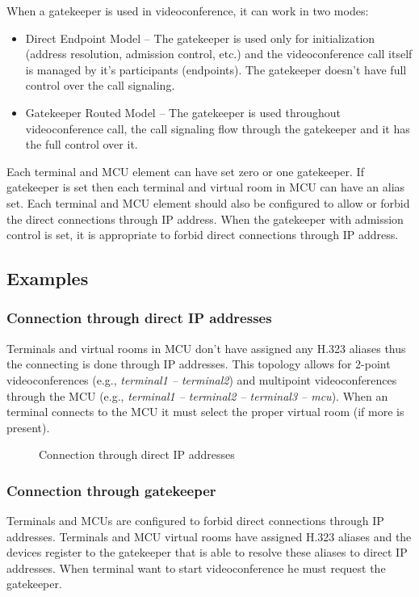 \documentclass[a4paper]{report}
\newcommand{\graph}[4]{
\begin{figure}[h!]
\centering\scalebox{\ifx&#4& 0.75 \else #4 \fi}{}
\label{#1}
\caption{#3}
\end{figure}
}
\begin{document}
When a gatekeeper is used in videoconference, it can work in two modes:
\begin{itemize}
\item Direct Endpoint Model -- The gatekeeper is used only for initialization (address resolution, admission control, etc.) and the videoconference call itself is managed by it's participants (endpoints). The gatekeeper doesn't have full control over the call signaling.
\item Gatekeeper Routed Model -- The gatekeeper is used throughout videoconference call, the call signaling flow through the gatekeeper and it has the full control over it.
\end{itemize}

Each terminal and MCU element can have set zero or one gatekeeper. If gatekeeper is set then each terminal and virtual room in MCU can have an alias set. Each terminal and MCU element should also be configured to allow or forbid the direct connections through IP address. When the gatekeeper with admission control is set, it is appropriate to forbid direct connections through IP address.


\subsection{Examples}

\subsubsection{Connection through direct IP addresses}

Terminals and virtual rooms in MCU don't have assigned any H.323 aliases thus the connecting is done through IP addresses. This topology allows for 2-point videoconferences (e.g., \emph{terminal1 -- terminal2}) and multipoint videoconferences through the MCU (e.g., \emph{terminal1 -- terminal2 -- terminal3 -- mcu}). When an terminal connects to the MCU it must select the proper virtual room (if more is present).

\graph{graph:h323:direct}{graph/h323_direct.tex}{Connection through direct IP addresses}{}


\subsubsection{Connection through gatekeeper}

Terminals and MCUs are configured to forbid direct connections through IP addresses. Terminals and MCU virtual rooms have assigned H.323 aliases and the devices register to the gatekeeper that is able to resolve these aliases to direct IP addresses. When terminal want to start videoconference he must request the gatekeeper.
\end{document}

